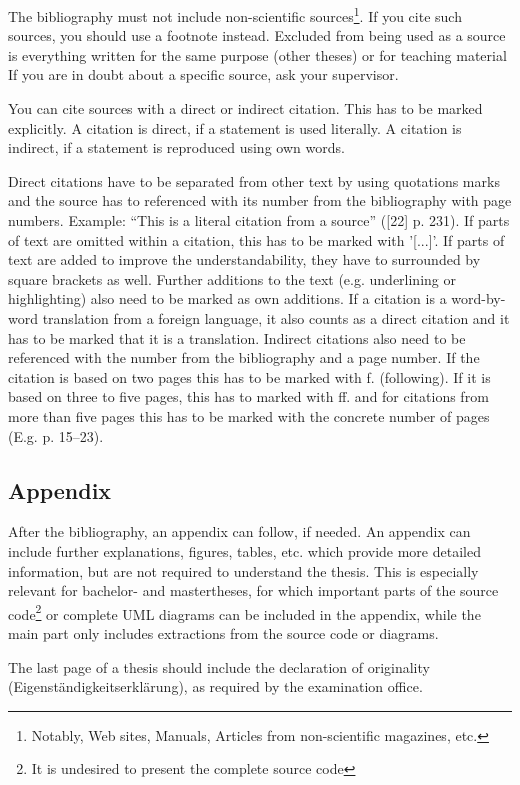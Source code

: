 The bibliography must not include non-scientific sources\footnote{Notably, Web sites, Manuals, Articles from non-scientific magazines, etc.}. 
If you cite such sources, you should use a footnote instead.
Excluded from being used as a source is everything written for the same purpose (other theses) or for teaching material
If you are in doubt about a specific source, ask your supervisor.

You can cite sources with a direct or indirect citation.
This has to be marked explicitly.
A citation is direct, if a statement is used literally.
A citation is indirect, if a statement is reproduced using own words.

Direct citations have to be separated from other text by using quotations marks and the source has to referenced with its number from the bibliography with page numbers. 
Example: "`This is a literal citation from a source"' ([22] p. 231). 
If parts of text are omitted within a citation, this has to be marked with '[...]'.
If parts of text are added to improve the understandability, they have to surrounded by square brackets as well. 
Further additions to the text (e.g. underlining	or highlighting) also need to be marked as own additions.
If a citation is a word-by-word translation from a foreign language, it also counts as a direct citation and it has to be marked that it is a translation.
Indirect citations also need to be referenced with the number from the bibliography and a page number.
If the citation is based on two pages this has to be marked with f. (following).
If it is based on three to five pages, this has to marked with ff. and for citations from more than five pages this has to be marked with the concrete number of pages (E.g. p. 15--23).

\subsection{Appendix}

After the bibliography, an appendix can follow, if needed.
An appendix can include further explanations, figures, tables, etc. which provide more detailed information, but are not required to understand the thesis.
This is especially relevant for bachelor- and mastertheses, for which important parts of the source code\footnote{It is undesired to present the complete source code} or complete UML diagrams can be included in the appendix, while the main part only includes extractions from the source code or diagrams.

The last page of a thesis should include the declaration of originality (Eigenständigkeitserklärung), as required by the examination office.

